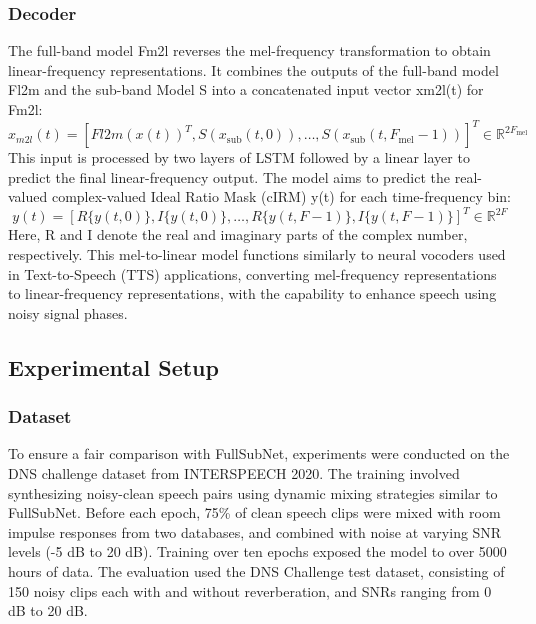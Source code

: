 \subsubsection{Decoder}
The full-band model Fm2l reverses the mel-frequency transformation to obtain linear-frequency representations. It combines the outputs of the full-band model Fl2m and the sub-band Model S into a concatenated input vector xm2l(t) for Fm2l:
\begin{equation}
    \label{eq:fast-fullsubnet-m2l}
    x_{m2l}(t) = [Fl2m(x(t))^T, S(x_{\text{sub}}(t, 0)), \ldots, S(x_{\text{sub}}(t, F_{\text{mel}} - 1))]^T \in \mathbb{R}^{2F_{\text{mel}}}
\end{equation}
This input is processed by two layers of LSTM followed by a linear layer to predict the final linear-frequency output. The model aims to predict the real-valued complex-valued Ideal Ratio Mask (cIRM) y(t) for each time-frequency bin:
\begin{equation}
    \label{eq:fast-fullsubnet-output}
    y(t) = [R\{y(t, 0)\}, I\{y(t, 0)\}, \ldots, R\{y(t, F - 1)\}, I\{y(t, F - 1)\}]^T \in \mathbb{R}^{2F}
\end{equation}
Here, R{} and I{} denote the real and imaginary parts of the complex number, respectively. This mel-to-linear model functions similarly to neural vocoders used in Text-to-Speech (TTS) applications, converting mel-frequency
representations to linear-frequency representations, with the capability to enhance speech using noisy signal phases.

\subsection{Experimental Setup}
\subsubsection{Dataset}
To ensure a fair comparison with FullSubNet, experiments were conducted on the DNS challenge dataset \cite{reddy2020} from INTERSPEECH 2020.
The training involved synthesizing noisy-clean speech pairs using dynamic mixing strategies similar to FullSubNet. Before each epoch, 75\%
of clean speech clips were mixed with room impulse responses from two databases, and combined with noise at varying SNR levels (-5 dB to 20 dB).
Training over ten epochs exposed the model to over 5000 hours of data. The evaluation used the DNS Challenge test dataset, consisting of 150 noisy clips each with and without reverberation,
and SNRs ranging from 0 dB to 20 dB.

